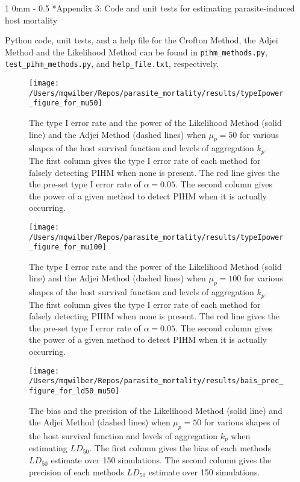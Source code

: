 \documentclass[12pt, a4paper]{article}
\makeatletter
\renewcommand{\section}{\@startsection
{section}%
{1}%
{0mm}%
{-\baselineskip}%
{0.5\baselineskip}%
{\normalfont\bf\large}} %
\makeatother
\begin{document}
\section*{Appendix 3: Code and unit tests for estimating parasite-induced host mortality}

Python code, unit tests, and a help file for the Crofton Method, the Adjei Method and the Likelihood Method can be found in \verb*#pihm_methods.py#, \verb*#test_pihm_methods.py#, and \verb*#help_file.txt#, respectively.


\begin{figure}

    \texttt{[image: /Users/mqwilber/Repos/parasite\_mortality/results/typeIpower\_figure\_for\_mu50]}

    \caption{The type I error rate and the power of the Likelihood Method (solid line) and the Adjei Method (dashed lines) when $\mu_p = 50$ for various shapes of the host survival function and levels of aggregation $k_p$.  The first column gives the type I error rate of each method for falsely detecting PIHM when none is present.  The red line gives the the pre-set type I error rate of $\alpha = 0.05$.  The second column gives the power of a given method to detect PIHM when it is actually occurring. }
    \label{fig:typeI50}

\end{figure}

\begin{figure}

    \texttt{[image: /Users/mqwilber/Repos/parasite\_mortality/results/typeIpower\_figure\_for\_mu100]}

    \caption{The type I error rate and the power of the Likelihood Method (solid line) and the Adjei Method (dashed lines) when $\mu_p = 100$ for various shapes of the host survival function and levels of aggregation $k_p$.  The first column gives the type I error rate of each method for falsely detecting PIHM when none is present.  The red line gives the the pre-set type I error rate of $\alpha = 0.05$.  The second column gives the power of a given method to detect PIHM when it is actually occurring. }
    \label{fig:typeI100}

\end{figure}

\begin{figure}

    \texttt{[image: /Users/mqwilber/Repos/parasite\_mortality/results/bais\_prec\_figure\_for\_ld50\_mu50]}

    \caption{The bias and the precision of the Likelihood Method (solid line) and the Adjei Method (dashed lines) when $\mu_p = 50$ for various shapes of the host survival function and levels of aggregation $k_p$ when estimating $LD_{50}$.  The first column gives the bias of each methods $LD_{50}$ estimate over 150 simulations. The second column gives the precision of each methods $LD_{50}$ estimate over 150 simulations.}

    \label{fig:biasld50_50}

\end{figure}
\end{document}
